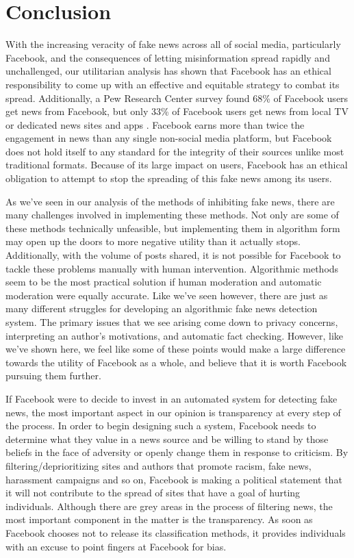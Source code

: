 \documentclass[12pt]{article}
\begin{document}
\section{Conclusion}

With the increasing veracity of fake news across all of social media, particularly Facebook, and the consequences of letting misinformation spread rapidly and unchallenged, our utilitarian analysis has shown that Facebook has an ethical responsibility to come up with an effective and equitable strategy to combat its spread. Additionally, a Pew Research Center survey found 68\% of Facebook users get news from Facebook, but only 33\% of Facebook users get news from local TV or dedicated news sites and apps \citep{pew_news}. Facebook earns more than twice the engagement in news than any single non-social media platform, but Facebook does not hold itself to any standard for the integrity of their sources unlike most traditional formats. Because of its large impact on users, Facebook has an ethical obligation to attempt to stop the spreading of this fake news among its users.

As we've seen in our analysis of the methods of inhibiting fake news, there are many challenges involved in implementing these methods. Not only are some of these methods technically unfeasible, but implementing them in algorithm form may open up the doors to more negative utility than it actually stops. Additionally, with the volume of posts shared, it is not possible for Facebook to tackle these problems manually with human intervention. Algorithmic methods seem to be the most practical solution if human moderation and automatic moderation were equally accurate. Like we've seen however, there are just as many different struggles for developing an algorithmic fake news detection system. The primary issues that we see arising come down to privacy concerns, interpreting an author's motivations, and automatic fact checking. However, like we've shown here, we feel like some of these points would make a large difference towards the utility of Facebook as a whole, and believe that it is worth Facebook pursuing them further.

If Facebook were to decide to invest in an automated system for detecting fake news, the most important aspect in our opinion is transparency at every step of the process. In order to begin designing such a system, Facebook needs to determine what they value in a news source and be willing to stand by those beliefs in the face of adversity or openly change them in response to criticism. By filtering/deprioritizing sites and authors that promote racism, fake news, harassment campaigns and so on, Facebook is making a political statement that it will not contribute to the spread of sites that have a goal of hurting individuals. Although there are grey areas in the process of filtering news, the most important component in the matter is the transparency. As soon as Facebook chooses not to release its classification methods, it provides individuals with an excuse to point fingers at Facebook for bias. 

\newpage
%
%
\printbibliography
\end{document}
